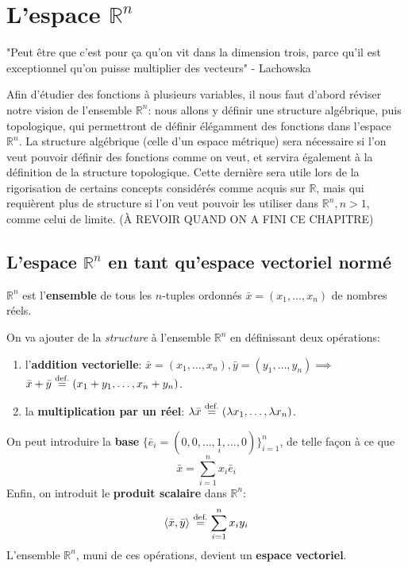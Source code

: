 \documentclass{report}
\newcommand*\eqdef{\; \stackrel{ \mathclap{ \normalfont\text{def.} } }{ = } \;} %
\begin{document}
\chapter{L'espace $\mathbb R^n$}

\begin{center}
"Peut être que c'est pour ça qu'on vit dans la dimension trois, parce qu'il est exceptionnel qu'on puisse multiplier des vecteurs" - Lachowska
\end{center}

Afin d'étudier des fonctions à plusieurs variables, il nous faut d'abord réviser notre vision de l'ensemble $\mathbb R^n$: nous allons y définir une structure algébrique, puis topologique, qui permettront de définir élégamment des fonctions dans l'espace $\mathbb R^n$. La structure algébrique (celle d'un espace métrique) sera nécessaire si l'on veut pouvoir définir des fonctions comme on veut, et servira également à la définition de la structure topologique. Cette dernière sera utile lors de la rigorisation de certains concepts considérés comme acquis sur $\mathbb R$, mais qui requièrent plus de structure si l'on veut pouvoir les utiliser dans $\mathbb R^n, n > 1$, comme celui de limite. (À REVOIR QUAND ON A FINI CE CHAPITRE)

\section{L'espace $\mathbb R^n$ en tant qu'espace vectoriel normé}
\begin{defn}
	$\mathbb R^n$ est l'\textbf{ensemble} de tous les $n$-tuples ordonnés $\bar x = (x_1, \ldots, x_n)$ de nombres réels. 
\end{defn}

\begin{defn}
	On va ajouter de la \emph{structure} à l'ensemble $\mathbb R^n$ en définissant deux opérations:
	\begin{enumerate}
		\item l'\textbf{addition vectorielle}: $\bar x = (x_1, \ldots, x_n), \bar y = (y_1, \ldots, y_n) \implies$ \\ $\bar x + \bar y \eqdef (x_1 + y_1, \ldots, x_n + y_n)$.
		\item la \textbf{multiplication par un réel}: $\lambda \bar x \eqdef (\lambda x_1, \ldots, \lambda x_n)$.
	\end{enumerate}
	On peut introduire la \textbf{base} $\{\bar e_i = (0, 0, \ldots, \underset{i}{1}, \ldots, 0)\}_{i=1}^n$, de telle façon à ce que
	\begin{equation}
		\bar x = \sum_{i=1}^n x_i \bar e_i
	\end{equation}
	Enfin, on introduit le \textbf{produit scalaire} dans $\mathbb R^n$:
	\begin{equation}
		\langle \bar x, \bar y \rangle \eqdef \sum_{i=1}^n x_i y_i
	\end{equation}
	L'ensemble $\mathbb R^n$, muni de ces opérations, devient un \textbf{espace vectoriel}.
\end{defn}
\end{document}
